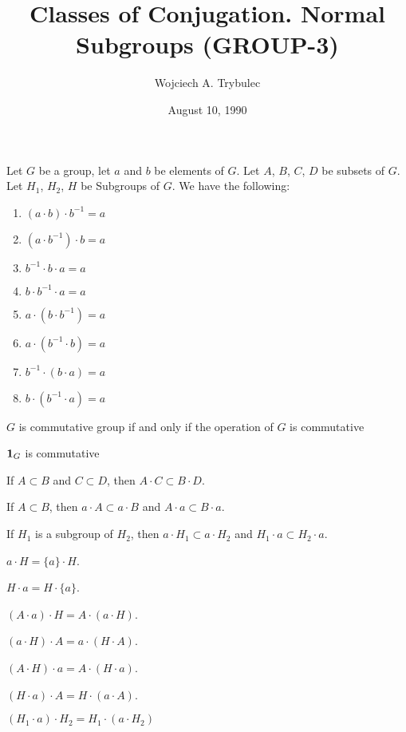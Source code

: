 \documentclass{article}
\title{Classes of Conjugation. Normal Subgroups (GROUP-3)}
\author{Wojciech A. Trybulec}
\date{August 10, 1990}
\begin{document}
\maketitle

Let $G$ be a group, let $a$ and $b$ be elements of $G$. Let $A$, $B$,
$C$, $D$ be subsets of $G$. Let $H_{1}$, $H_{2}$, $H$ be Subgroups of $G$.
We have the following:
\begin{thm}
\item\label{group3:1}
  \begin{enumerate}[label=(\roman*)]
  \item $(a\cdot b)\cdot b^{-1}=a$
  \item $(a\cdot b^{-1})\cdot b=a$
  \item $b^{-1}\cdot b\cdot a=a$
  \item $b\cdot b^{-1}\cdot a=a$
  \item $a\cdot(b\cdot b^{-1})=a$
  \item $a\cdot(b^{-1}\cdot b)=a$
  \item $b^{-1}\cdot(b\cdot a)=a$
  \item $b\cdot(b^{-1}\cdot a)=a$
  \end{enumerate}
\item\label{group3:2} $G$ is commutative group if and only if the
  operation of $G$ is commutative
\item\label{group3:3} $\mathbf{1}_{G}$ is commutative
\item\label{group3:4} If $A\subset B$ and $C\subset D$, then $A\cdot C\subset B\cdot D$.
\item\label{group3:5} If $A\subset B$, then
  $a\cdot A\subset a\cdot B$ and $A\cdot a\subset B\cdot a$.
\item\label{group3:6} If $H_{1}$ is a subgroup of $H_{2}$, then $a\cdot H_{1}\subset a\cdot H_{2}$
  and $H_{1}\cdot a\subset H_{2}\cdot a$.
\item\label{group3:7} $a\cdot H=\{a\}\cdot H$.
\item\label{group3:8} $H\cdot a=H\cdot\{a\}$.
\item\label{group3:9} $(A\cdot a)\cdot H=A\cdot(a\cdot H)$.
\item\label{group3:10} $(a\cdot H)\cdot A=a\cdot(H\cdot A)$.
\item\label{group3:11} $(A\cdot H)\cdot a=A\cdot(H\cdot a)$.
\item\label{group3:12} $(H\cdot a)\cdot A=H\cdot(a\cdot A)$.
\item\label{group3:13} $(H_{1}\cdot a)\cdot H_{2}=H_{1}\cdot(a\cdot H_{2})$
\end{thm}
\end{document}
